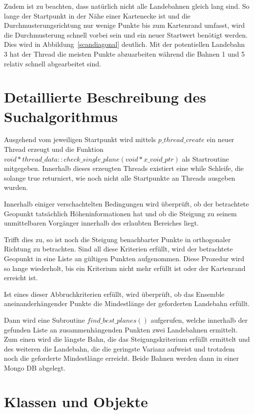 \documentclass[10pt,a4paper]{report}
\begin{document}
Zudem ist zu beachten, dass natürlich nicht alle Landebahnen gleich lang sind. So lange der Startpunkt in der Nähe einer Kartenecke ist und die Durchmusterungsrichtung nur wenige Punkte bis zum Kartenrand umfasst, wird die Durchmusterung schnell vorbei sein und ein neuer Startwert benötigt werden. Dies wird in Abbildung~\ref{scandiagonal} deutlich. Mit der potentiellen Landebahn 3 hat der Thread die meisten Punkte abzuarbeiten während die Bahnen 1 und 5 relativ schnell abgearbeitet sind. 

\section{Detaillierte Beschreibung des Suchalgorithmus}

Ausgehend vom jeweiligen Startpunkt wird mittels $p\_thread\_create$ ein neuer Thread erzeugt und die Funktion $void *thread\_data::check\_single\_plane(void *x\_void\_ptr)$ als Startroutine mitgegeben. Innerhalb dieses erzeugten Threads existiert eine while Schleife, die solange true returniert, wie noch nicht alle Startpunkte an Threads ausgeben wurden.

Innerhalb einiger verschachtelten Bedingungen wird überprüft, ob der betrachtete Geopunkt tatsächlich Höheninformationen hat und ob die Steigung zu seinem unmittelbaren Vorgänger innerhalb des erlaubten Bereiches liegt.

Trifft dies zu, so ist noch die Steigung benachbarter Punkte in orthogonaler Richtung zu betrachten. Sind all diese Kriterien erfüllt, wird der betrachtete Geopunkt in eine Liste an gültigen Punkten aufgenommen. Diese Prozedur wird so lange wiederholt, bis ein Kriterium nicht mehr erfüllt ist oder der Kartenrand erreicht ist.

Ist eines dieser Abbruchkriterien erfüllt, wird überprüft, ob das Ensemble aneinanderhängender Punkte die Mindestlänge der geforderten Landebahn erfüllt.

Dann wird eine Subroutine $find\_best\_planes()$ aufgerufen, welche innerhalb der gefunden Liste an zusammenhängenden Punkten zwei Landebahnen ermittelt. Zum einen wird die längste Bahn, die das Steigungskriterium erfüllt ermittelt und des weiteren die Landebahn, die die geringste Varianz aufweist und trotzdem noch die geforderte Mindestlänge erreicht. 
Beide Bahnen werden dann in einer Mongo DB abgelegt.

\section{Klassen und Objekte}
\end{document}
